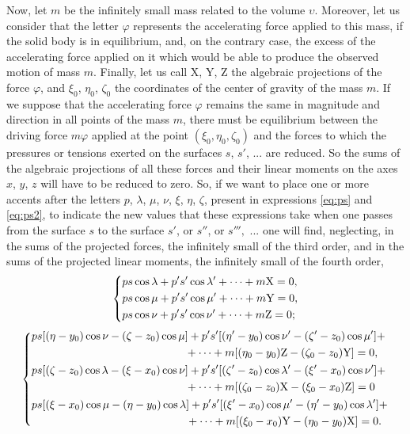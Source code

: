\documentclass[leqno,openright,smallroyalvopaper,8pt,twoside,showtrims]{memoir}
\begin{document}
Now, let $m$ be the infinitely small mass related to the volume $\upsilon$. Moreover, let us consider that the letter $\varphi$ represents the accelerating force applied to this mass, if the solid body is in equilibrium, and, on the contrary case, the excess of the accelerating force applied on it which would be able to produce the observed motion of mass $m$. Finally, let us call X, Y, Z the algebraic projections of the force $\varphi$, and $\xi_0$, $\eta_0$, $\zeta_0$ the coordinates of the center of gravity of the mass $m$. If we suppose that the accelerating force $\varphi$ remains the same in magnitude and direction in all points of the mass $m$, there must be equilibrium between the driving force $m\varphi$ applied at the point $(\xi_0,\eta_0,\zeta_0)$ and the forces to which the pressures or tensions exerted on the surfaces $s$, $s'$, ... are reduced. So the sums of the algebraic projections of all these forces and their linear moments on the axes $x$, $y$, $z$ will have to be reduced to zero. So, if we want to place one or more accents after the letters $p$, $\lambda$, $\mu$, $\nu$, $\xi$, $\eta$, $\zeta$, present in expressions \eqref{eq:ps} and \eqref{eq:ps2}, to indicate the new values that these expressions take when one passes from the surface $s$ to the surface $s'$, or $s''$, or $s''',$ ... one will find, neglecting, in the sums of the projected forces, the infinitely small of the third order, and in the sums of the projected linear moments, the infinitely small of the fourth order,
 \begin{equation}\label{eq:forcas}
   \begin{dcases}
        ps\cos\lambda+p's'\cos\lambda'+\cdots+m\text{X}=0,\\
       ps\cos\mu+p's'\cos\mu'+\cdots+m\text{Y}=0,\\
        ps\cos\nu+p's'\cos\nu'+\cdots+m\text{Z}=0;
   \end{dcases}
 \end{equation}
 \begin{equation}\label{eq:momentos}
   \begin{dcases}
   \begin{aligned}
        ps[(\eta-y_0)\cos\nu-(\zeta-z_0)\cos\mu&]+p's'[(\eta'-y_0)\cos\nu'-(\zeta'-z_0)\cos\mu']+\\
        &+\cdots+m[(\eta_0-y_0)\text{Z}-(\zeta_0-z_0)\text{Y}]=0,
   \end{aligned}\\
         \begin{aligned}
        ps[(\zeta-z_0)\cos\lambda-(\xi-x_0)\cos\nu&]+p's'[(\zeta'-z_0)\cos\lambda'-(\xi'-x_0)\cos\nu']+\\
        &+\cdots+m[(\zeta_0-z_0)\text{X}-(\xi_0-x_0)\text{Z}]=0
   \end{aligned}\\
         \begin{aligned}
        ps[(\xi-x_0)\cos\mu-(\eta-y_0)\cos\lambda&]+p's'[(\xi'-x_0)\cos\mu'-(\eta'-y_0)\cos\lambda']+\\
        &+\cdots+m[(\xi_0-x_0)\text{Y}-(\eta_0-y_0)\text{X}]=0.
   \end{aligned}
   \end{dcases}
 \end{equation}
\end{document}
